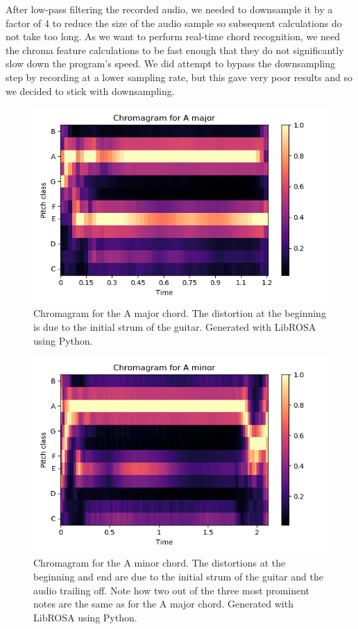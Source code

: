 \documentclass[journal]{IEEEtran}
\begin{document}
After low-pass filtering the recorded audio, we needed to downsample it by a factor of 4 to reduce the size of the audio sample so subsequent calculations do not take too long.
As we want to perform real-time chord recognition, we need the chroma feature calculations to be fast enough that they do not significantly slow down the program's speed.
We did attempt to bypass the downsampling step by recording at a lower sampling rate, but this gave very poor results and so we decided to stick with downsampling.

\begin{figure}[!t]
    \centering
    \includegraphics[width = \linewidth]{../Figures/chromagram_a_major}
    \caption{Chromagram for the A major chord.
    The distortion at the beginning is due to the initial strum of the guitar.
    Generated with LibROSA using Python.}
    \label{fig:a_major}
\end{figure}
\begin{figure}[!t]
    \centering
    \includegraphics[width = \linewidth]{../Figures/chromagram_a_minor}
    \caption{Chromagram for the A minor chord.
    The distortions at the beginning and end are due to the initial strum of the guitar and the audio trailing off.
    Note how two out of the three most prominent notes are the same as for the A major chord.
    Generated with LibROSA using Python.}
    \label{fig:a_minor}
\end{figure}
\end{document}
